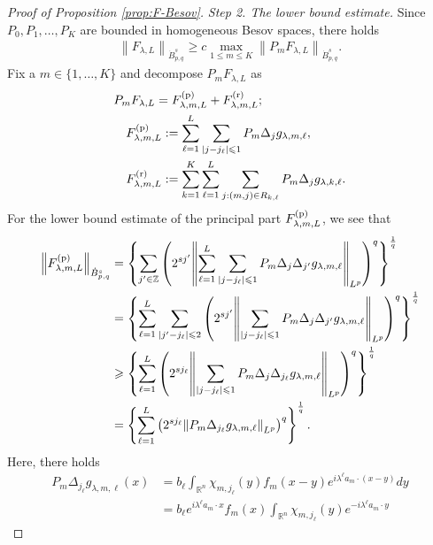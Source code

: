 \documentclass[a4paper,12pt,reqno]{amsart}
\theoremstyle{plain}
\theoremstyle{definition}
\newcommand{\dB}{\dot{B}}
\renewcommand{\leq}{\leqslant}
\renewcommand{\geq}{\geqslant}
\newcommand{\n}[1]{{\left\|#1\right\|}}
\newcommand{\R}{\mathbb{R}}
\newcommand{\Mp}[1]{\left\{#1\right\}}
\renewcommand{\sp}[1]{\left(#1\right)}
\newcommand{\p}{{\rm p}}
\renewcommand{\r}{{\rm r}}
\begin{document}
\begin{proof}[Proof of Proposition \ref{prop:F-Besov}]
\noindent
{\it Step 2. The lower bound estimate.}
%
Since $P_0,P_1,\dots,P_K$ are bounded in homogeneous Besov spaces, there holds
\begin{align}
    \n{F_{\lambda,L}}_{\dB_{p,q}^s}
    \geq 
    c
    \max_{1 \leq m \leq K}
    \n{P_mF_{\lambda,L}}_{\dB_{p,q}^s}.
\end{align}
Fix a $m \in \{1,\dots,K\}$ and
decompose $P_mF_{\lambda,L}$ as
\begin{align}
    &P_mF_{\lambda,L}
    =
    F^{(\p)}_{\lambda,m,L}
    +
    F^{(\r)}_{\lambda,m,L};
    \\
    &
    \quad
    F^{(\p)}_{\lambda,m,L}
    :=
    \sum_{\ell=1}^L
    \sum_{|j-j_{\ell}|\leq 1}
    P_m\Delta_jg_{\lambda,m,\ell},
    \\
    &
    \quad
    F^{(\r)}_{\lambda,m,L}
    :=
    \sum_{k=1}^K
    \sum_{\ell=1}^L
    \sum_{j:(m,j) \in R_{k,\ell}}
    P_m\Delta_jg_{\lambda,k,\ell}.
\end{align}
For the lower bound estimate of the principal part $F^{(\p)}_{\lambda,m,L}$, we see that 
\begin{align}
    \n{F_{\lambda,m,L}^{(\p)}}_{\dB_{p,q}^s}
    &
    =
    \Mp{
    \sum_{j' \in \mathbb{Z}}
    \sp{
    2^{sj'}
    \n{
    \sum_{\ell=1}^L
    \sum_{|j-j_{\ell}|\leq 1}
    P_m\Delta_j\Delta_{j'}g_{\lambda,m,\ell}
    }_{L^p}
    }^q
    }^{\frac{1}{q}}
    \\
    &
    =
    \Mp{
    \sum_{\ell=1}^L
    \sum_{|j'-j_{\ell}|\leq 2}
    \sp{
    2^{sj'}
    \n{
    \sum_{|j-j_{\ell}|\leq 1}
    P_m\Delta_j\Delta_{j'}g_{\lambda,m,\ell}
    }_{L^p}
    }^q
    }^{\frac{1}{q}}
    \\
    &
    \geq 
    \Mp{
    \sum_{\ell=1}^L
    \sp{
    2^{sj_{\ell}}
    \n{
    \sum_{|j-j_{\ell}|\leq 1}
    P_m\Delta_j\Delta_{j_{\ell}}g_{\lambda,m,\ell}
    }_{L^p}
    }^q
    }^{\frac{1}{q}}
    \\
    &
    =
    \Mp{
    \sum_{\ell=1}^L
    \sp{
    2^{sj_{\ell}}
    \n{
    P_m\Delta_{j_{\ell}}g_{\lambda,m,\ell}
    }_{L^p}
    }^q
    }^{\frac{1}{q}}.
    \label{est:low-Fp}
\end{align}
Here, there holds
\begin{align}
    P_m\Delta_{j_{\ell}}g_{\lambda,m,\ell}(x)
    &=
    b_{\ell}
    \int_{\R^n}
    \chi_{m,j_{\ell}}(y)f_m(x-y)e^{i\lambda^\ell a_m\cdot(x-y)}dy
    \\
    &
    =
    b_{\ell}
    e^{i\lambda^\ell a_m\cdot x}
    f_m(x)
    \int_{\R^n}
    \chi_{m,j_{\ell}}(y)e^{-i\lambda^\ell a_m\cdot y}

\end{align}
\end{proof}
\end{document}
